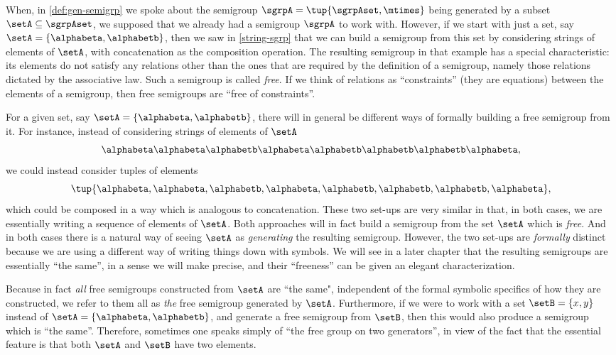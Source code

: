 When, in \cref{def:gen-semigrp} we spoke about the semigroup $\sgrpA = \tup{\sgrpAset, \mtimes}$  being generated by a subset $\setA \subseteq \sgrpAset$, we supposed that we already had a semigroup $\sgrpA$ to work with.
However, if we start with just a set, say $\setA = \{ \alphabeta, \alphabetb\}$, then we saw in \cref{string-sgrp} that we can build a semigroup from this set by considering strings of elements of $\setA$, with concatenation as the composition operation.
The resulting semigroup in that example has a special characteristic: its elements do not satisfy any relations other than the ones that are required by the definition of a semigroup, namely those relations dictated by the associative law.
Such a semigroup is called \emph{free}.
If we think of relations as ``constraints'' (they are equations) between the elements of a semigroup, then free semigroups are ``free of constraints''.

For a given set, say $\setA = \{ \alphabeta, \alphabetb\}$, there will in general be different ways of formally building a free semigroup from it.
For instance, instead of considering strings of elements of $\setA$
\begin{equation}
    \alphabeta\alphabeta \alphabetb \alphabeta \alphabetb \alphabetb \alphabetb \alphabeta,
\end{equation}
we could instead consider tuples of elements
\begin{equation}
    \tup{ \alphabeta, \alphabeta,  \alphabetb,  \alphabeta,  \alphabetb,  \alphabetb,  \alphabetb,  \alphabeta},
\end{equation}
which could be composed in a way which is analogous to concatenation.
These two set-ups are very similar in that, in both cases, we are essentially writing a sequence of elements of $\setA$.
Both approaches will in fact build a semigroup from the set $\setA$ which is \emph{free}.
And in both cases there is a natural way of seeing $\setA$ as \emph{generating} the resulting semigroup.
However, the two set-ups are \emph{formally} distinct because we are using a different way of writing things down with symbols.
We will see in a later chapter that the resulting semigroups are essentially ``the same'', in a sense we will make precise, and their ``freeness'' can be given an elegant characterization.

Because in fact \emph{all} free semigroups constructed from $\setA$ are ``the same", independent of the formal symbolic specifics of how they are constructed, we refer to them all as \emph{the} free semigroup generated by $\setA$.
Furthermore, if we were to work with a set $\setB = \{ x, y \}$ instead of $\setA = \{ \alphabeta, \alphabetb\}$, and generate a free semigroup from $\setB$, then this would also produce a semigroup which is ``the same''.
Therefore, sometimes one speaks simply of ``the free group on two generators'', in view of the fact that the essential feature is that both $\setA$ and $\setB$ have two elements.

